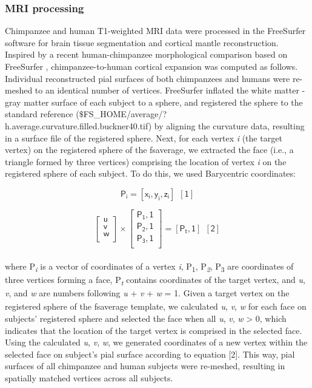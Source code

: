 \begin{refsection}
\subsubsection*{MRI processing}
Chimpanzee and human T1-weighted MRI data were processed in the FreeSurfer software \citep{Fischl2004parcellation,FISCHL2012Freesurfer} for brain tissue segmentation and cortical mantle reconstruction. Inspired by a recent human-chimpanzee morphological comparison based on FreeSurfer \citep{donahue2018quantitative}, chimpanzee-to-human cortical expansion was computed as follows. Individual reconstructed pial surfaces of both chimpanzees and humans were re-meshed to an identical number of vertices. FreeSurfer inflated the white matter - gray matter surface of each subject to a sphere, and registered the sphere to the standard reference ($\$$FS\_HOME/average/?h.average.curvature.filled.buckner40.tif) by aligning the curvature data, resulting in a surface file of the registered sphere. Next, for each vertex \textit{i} (the target vertex) on the registered sphere of the fsaverage, we extracted the face (i.e., a triangle formed by three vertices) comprising the location of vertex \textit{i} on the registered sphere of each subject. To do this, we used Barycentric coordinates:

\[\mathsf{ P_{i}= [x_{i}, y_{i}, z_{i}] \ \ [1] }\]

\[  \left[ \begin{matrix}
\mathsf{u}\\
\mathsf{v}\\
\mathsf{w}\\
\end{matrix}
 \right]  \times  \left[ \begin{matrix}
\mathsf{P_{1}, 1}\\
\mathsf{P_{2},1}\\
\mathsf{P_{3},1}\\
\end{matrix}
 \right] = \left[ \mathsf{P_{t}, 1} \right] \ \ [\mathsf{2}] \] \\

\noindent
where P\textit{\textsubscript{i}} is a vector of coordinates of a vertex \textit{i}, P\textsubscript{1}, P\textit{\textsubscript{2}}, P\textsubscript{3} are coordinates of three vertices forming a face, P\textit{\textsubscript{t}}\textsubscript{ }contains coordinates of the target vertex, and \textit{u}, \textit{v}, and \textit{w} are numbers following \textit{u} + \textit{v} + \textit{w} = 1. Given a target vertex\textit{\textsubscript{ }}on the registered sphere of the fsaverage template, we calculated \textit{u}, \textit{v}, \textit{w }for each face on subjects' registered sphere and selected the face when all \textit{u}, \textit{v}, \textit{w} > 0, which indicates that the location of the target vertex is comprised in the selected face. Using the calculated \textit{u}, \textit{v}, \textit{w}, we generated coordinates of a new vertex within the selected face on subject’s pial surface according to equation [2]. This way, pial surfaces of all chimpanzee and human subjects were re-meshed, resulting in spatially matched vertices across all subjects.


\end{refsection}

